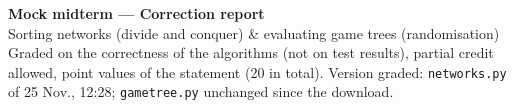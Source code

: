 \documentclass[11pt,a4paper]{article}
\begin{document}
\begin{center}
{\LARGE\bfseries Mock midterm --- Correction report}\\[0.3em]
{\large Sorting networks (divide and conquer) \& evaluating game trees (randomisation)}\\[0.2em]
{\small Graded on the correctness of the algorithms (not on test results), partial credit allowed,
point values of the statement (20 in total). Version graded: \texttt{networks.py} of 25 Nov., 12:28;
\texttt{gametree.py} unchanged since the download.}
\end{center}

\vspace{0.3em}
\begin{center}
\end{center}
\end{document}
